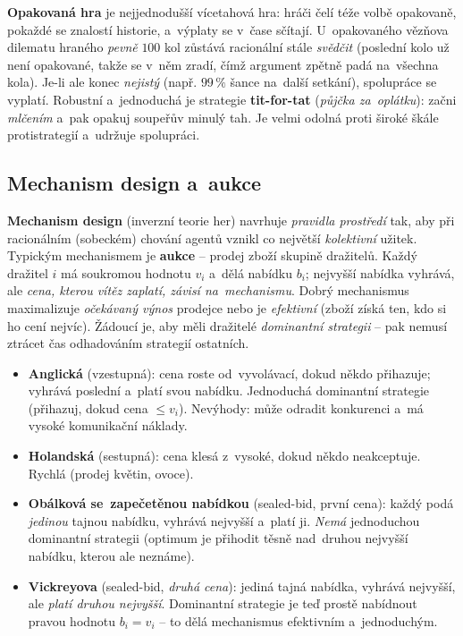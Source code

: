 \textbf{Opakovaná hra} je nejjednodušší vícetahová hra: hráči čelí téže volbě opakovaně, pokaždé se znalostí historie, a~výplaty se v~čase sčítají. U~opakovaného vězňova dilematu hraného \emph{pevně} $100$ kol zůstává racionální stále \emph{svědčit} (poslední kolo už není opakované, takže se v~něm zradí, čímž argument zpětně padá na~všechna kola). Je-li ale konec \emph{nejistý} (např. $99\,\%$ šance na~další setkání), spolupráce se vyplatí. Robustní a~jednoduchá je strategie \textbf{tit-for-tat} (\emph{půjčka za~oplátku}): začni \emph{mlčením} a~pak opakuj soupeřův minulý tah. Je velmi odolná proti široké škále protistrategií a~udržuje spolupráci.

\subsection{Mechanism design a~aukce}

\textbf{Mechanism design} (inverzní teorie her) navrhuje \emph{pravidla prostředí} tak, aby při racionálním (sobeckém) chování agentů vznikl co největší \emph{kolektivní} užitek. Typickým mechanismem je \textbf{aukce} -- prodej zboží skupině dražitelů. Každý dražitel $i$ má soukromou hodnotu $v_i$ a~dělá nabídku $b_i$; nejvyšší nabídka vyhrává, ale \emph{cena, kterou vítěz zaplatí, závisí na~mechanismu}. Dobrý mechanismus maximalizuje \emph{očekávaný výnos} prodejce nebo je \emph{efektivní} (zboží získá ten, kdo si ho cení nejvíc). Žádoucí je, aby měli dražitelé \emph{dominantní strategii} -- pak nemusí ztrácet čas odhadováním strategií ostatních.

\begin{poznamka}
\begin{itemize}
  \item \textbf{Anglická} (vzestupná): cena roste od~vyvolávací, dokud někdo přihazuje; vyhrává poslední a~platí svou nabídku. Jednoduchá dominantní strategie (přihazuj, dokud cena $\le v_i$). Nevýhody: může odradit konkurenci a~má vysoké komunikační náklady.
  \item \textbf{Holandská} (sestupná): cena klesá z~vysoké, dokud někdo neakceptuje. Rychlá (prodej květin, ovoce).
  \item \textbf{Obálková se~zapečetěnou nabídkou} (sealed-bid, první cena): každý podá \emph{jedinou} tajnou nabídku, vyhrává nejvyšší a~platí ji. \emph{Nemá} jednoduchou dominantní strategii (optimum je přihodit těsně nad~druhou nejvyšší nabídku, kterou ale neznáme).
  \item \textbf{Vickreyova} (sealed-bid, \emph{druhá cena}): jediná tajná nabídka, vyhrává nejvyšší, ale \emph{platí druhou nejvyšší}. Dominantní strategie je teď prostě nabídnout pravou hodnotu $b_i=v_i$ -- to dělá mechanismus efektivním a~jednoduchým.
\end{itemize}
\end{poznamka}

